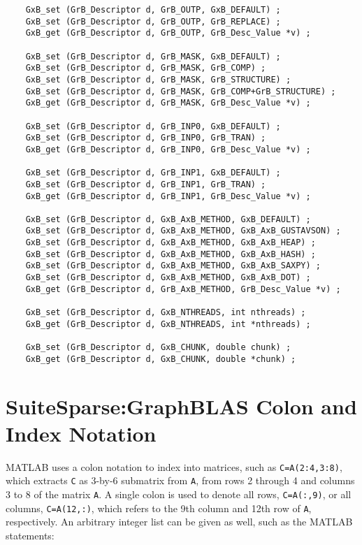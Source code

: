 \documentclass[12pt]{article}
\begin{document}
    {\footnotesize
    \begin{verbatim}
    GxB_set (GrB_Descriptor d, GrB_OUTP, GxB_DEFAULT) ;
    GxB_set (GrB_Descriptor d, GrB_OUTP, GrB_REPLACE) ;
    GxB_get (GrB_Descriptor d, GrB_OUTP, GrB_Desc_Value *v) ;

    GxB_set (GrB_Descriptor d, GrB_MASK, GxB_DEFAULT) ;
    GxB_set (GrB_Descriptor d, GrB_MASK, GrB_COMP) ;
    GxB_set (GrB_Descriptor d, GrB_MASK, GrB_STRUCTURE) ;
    GxB_set (GrB_Descriptor d, GrB_MASK, GrB_COMP+GrB_STRUCTURE) ;
    GxB_get (GrB_Descriptor d, GrB_MASK, GrB_Desc_Value *v) ;

    GxB_set (GrB_Descriptor d, GrB_INP0, GxB_DEFAULT) ;
    GxB_set (GrB_Descriptor d, GrB_INP0, GrB_TRAN) ;
    GxB_get (GrB_Descriptor d, GrB_INP0, GrB_Desc_Value *v) ;

    GxB_set (GrB_Descriptor d, GrB_INP1, GxB_DEFAULT) ;
    GxB_set (GrB_Descriptor d, GrB_INP1, GrB_TRAN) ;
    GxB_get (GrB_Descriptor d, GrB_INP1, GrB_Desc_Value *v) ;

    GxB_set (GrB_Descriptor d, GxB_AxB_METHOD, GxB_DEFAULT) ;
    GxB_set (GrB_Descriptor d, GxB_AxB_METHOD, GxB_AxB_GUSTAVSON) ;
    GxB_set (GrB_Descriptor d, GxB_AxB_METHOD, GxB_AxB_HEAP) ;
    GxB_set (GrB_Descriptor d, GxB_AxB_METHOD, GxB_AxB_HASH) ;
    GxB_set (GrB_Descriptor d, GxB_AxB_METHOD, GxB_AxB_SAXPY) ;
    GxB_set (GrB_Descriptor d, GxB_AxB_METHOD, GxB_AxB_DOT) ;
    GxB_get (GrB_Descriptor d, GrB_AxB_METHOD, GrB_Desc_Value *v) ;

    GxB_set (GrB_Descriptor d, GxB_NTHREADS, int nthreads) ;
    GxB_get (GrB_Descriptor d, GxB_NTHREADS, int *nthreads) ;

    GxB_set (GrB_Descriptor d, GxB_CHUNK, double chunk) ;
    GxB_get (GrB_Descriptor d, GxB_CHUNK, double *chunk) ; \end{verbatim} }

\newpage
\section{SuiteSparse:GraphBLAS Colon and Index Notation} %
\label{colon}

MATLAB uses a colon notation to index into matrices, such as
\verb'C=A(2:4,3:8)', which extracts \verb'C' as 3-by-6 submatrix from \verb'A',
from rows 2 through 4 and columns 3 to 8 of the matrix \verb'A'.  A single
colon is used to denote all rows, \verb'C=A(:,9)', or all columns,
\verb'C=A(12,:)', which refers to the 9th column and 12th row of \verb'A',
respectively.  An arbitrary integer list can be given as well, such as the
MATLAB statements:
\end{document}
